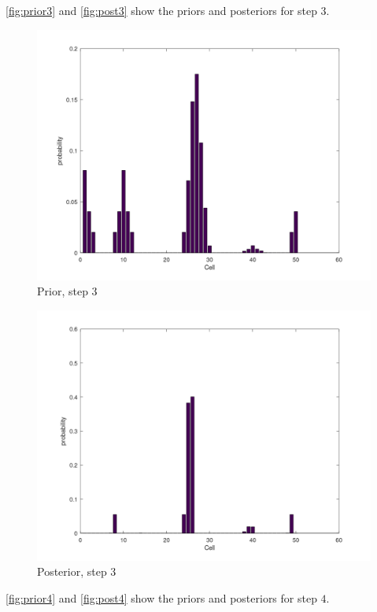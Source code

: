 \documentclass[11pt]{article}
\begin{document}
        \autoref{fig:prior3} and \autoref{fig:post3} show the priors and posteriors for step $3$.
        \begin{figure}[H]
            \centering
            \includegraphics[width=1.0\textwidth]{../images/prior3v2}
            \caption{Prior, step 3}
            \label{fig:prior3}
        \end{figure}
        \begin{figure}[H]
            \centering
            \includegraphics[width=1.0\textwidth]{../images/posterior3v2}
            \caption{Posterior, step 3}
            \label{fig:post3}
        \end{figure}
        \autoref{fig:prior4} and \autoref{fig:post4} show the priors and posteriors for step $4$.
\end{document}
